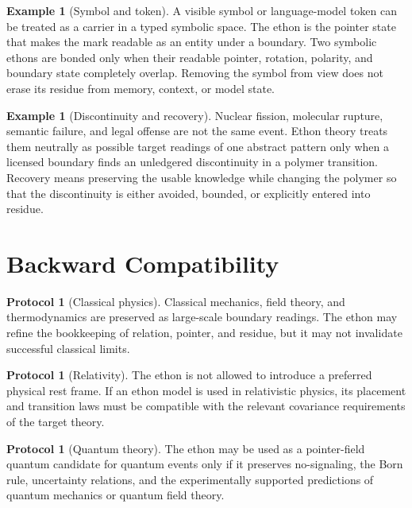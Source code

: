 \documentclass[11pt]{article}
\theoremstyle{definition}
\newtheorem{protocol}[definition]{Protocol}
\newtheorem{example}[definition]{Example}
\theoremstyle{plain}
\begin{document}
\begin{example}[Symbol and token]
A visible symbol or language-model token can be treated as a carrier in a
typed symbolic space.  The ethon is the pointer state that makes the mark
readable as an entity under a boundary.  Two symbolic ethons are bonded
only when their readable pointer, rotation, polarity, and boundary state
completely overlap.  Removing the symbol from view does not erase its
residue from memory, context, or model state.
\end{example}

\begin{example}[Discontinuity and recovery]
Nuclear fission, molecular rupture, semantic failure, and legal offense
are not the same event.  Ethon theory treats them neutrally as possible
target readings of one abstract pattern only when a licensed boundary
finds an unledgered discontinuity in a polymer transition.  Recovery
means preserving the usable knowledge while changing the polymer so that
the discontinuity is either avoided, bounded, or explicitly entered into
residue.
\end{example}

\section{Backward Compatibility}

\begin{protocol}[Classical physics]
Classical mechanics, field theory, and thermodynamics are preserved as
large-scale boundary readings.  The ethon may refine the bookkeeping of
relation, pointer, and residue, but it may not invalidate successful
classical limits.
\end{protocol}

\begin{protocol}[Relativity]
The ethon is not allowed to introduce a preferred physical rest frame.
If an ethon model is used in relativistic physics, its placement and
transition laws must be compatible with the relevant covariance
requirements of the target theory.
\end{protocol}

\begin{protocol}[Quantum theory]
The ethon may be used as a pointer-field quantum candidate for quantum
events only if it preserves no-signaling, the Born rule, uncertainty
relations, and the experimentally supported predictions of quantum
mechanics or quantum field theory.
\end{protocol}
\end{document}
